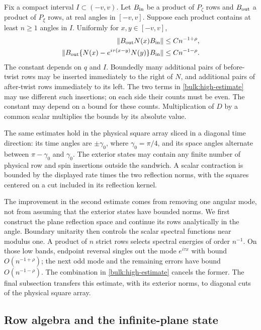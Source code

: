 \begin{theorem}\label{bulk:angular-estimate}
Fix a compact interval $I\subset(-v,v)$. Let $B_{\rm in}$ be a
product of $P_\zeta$ rows and $B_{\rm out}$ a product of $P_\xi$ rows,
at real angles in $[-v,v]$. Suppose each product contains at least
$n\ge1$ angles in $I$. Uniformly for $x,y\in[-v,v]$,
\begin{align}
 \|B_{\rm out}N(x)B_{\rm in}\|&\le Cn^{-1+\rho},
 \label{bulk:low-estimate}\\
 \|B_{\rm out}\{N(x)-e^{i\tau(x-y)}N(y)\}B_{\rm in}\|
 &\le Cn^{-1-\rho}.\label{bulk:high-estimate}
\end{align}
The constant depends on $q$ and $I$. Boundedly many additional pairs
of before-twist rows may be inserted immediately to the right of
$N$, and additional pairs of after-twist rows immediately to its
left. The two terms in \eqref{bulk:high-estimate} may use different
such insertions; on each side their counts must be even. The
constant may depend on a bound for these counts. Multiplication of
$D$ by a common scalar multiplies the bounds by its absolute value.

The same estimates hold in the physical square array sliced in a
diagonal time direction: its time angles are $\pm\gamma_0$, where
$\gamma_0=\pi/4$, and its space angles alternate between
$\pi-\gamma_0$ and $\gamma_0$. The exterior states may contain any
finite number of physical row and spin insertions outside the
sandwich. A scalar contraction is bounded by the displayed rate
times the two reflection norms, with the squares centered on a cut
included in its reflection kernel.
\end{theorem}

The improvement in the second estimate comes from removing one angular
mode, not from assuming that the exterior states have bounded norms.
We first construct the plane reflection space and continue its rows
analytically in the angle. Boundary unitarity then controls the scalar
spectral functions near modulus one. A product of $n$ strict rows
selects spectral energies of order $n^{-1}$. On those low bands,
endpoint reversal singles out the mode $e^{i\tau x}$ with bound
$O(n^{-1+\rho})$; the next odd mode and the remaining errors have
bound $O(n^{-1-\rho})$.
The combination in \eqref{bulk:high-estimate} cancels the former.
The final subsection transfers this estimate, with its exterior norms,
to diagonal cuts of the physical square array.

\subsection{Row algebra and the infinite-plane state}

